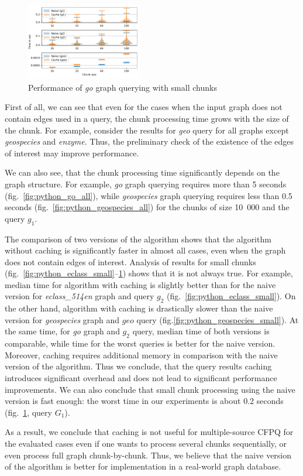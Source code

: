 \begin{figure}[h]
\centering
\includegraphics[width=0.45\textwidth]{data/raw/go_4.pdf}
\caption{Performance of \textit{go} graph querying with small chunks}
\label{fig:python_go_small}
\end{figure}


First of all, we can see that even for the cases when the input graph does not contain edges used in a query, the chunk processing time grows with the size of the chunk.
For example, consider the results for \textit{geo} query for all graphs except \textit{geospecies} and \textit{enzyme}.
Thus, the preliminary check of the existence of the edges of interest may improve performance.

We can also see, that the chunk processing time significantly depends on the graph structure.
For example, \textit{go} graph querying requires more than 5 seconds (fig.~\ref{fig:python_go_all}), while \textit{geospecies} graph querying requires less than 0.5 seconds (fig.~\ref{fig:python_geospecies_all}) for the chunks of size 10~000 and the query $g_1$.

The comparison of two versions of the algorithm shows that the algorithm without caching is significantly faster in almost all cases, even when the graph does not contain edges of interest.
Analysis of results for small chunks (fig.~\ref{fig:python_eclass_small}--\ref{fig:python_go_small}) shows that it is not always true.
For example, median time for algorithm with caching is slightly better than for the naive version for \textit{eclass\_514en} graph and query $g_2$ (fig.~\ref{fig:python_eclass_small}).
On the other hand, algorithm with caching is drastically slower than the naive version for \textit{geospecies} graph and $geo$ query (fig.\ref{fig:python_geospecies_small}).
At the same time, for \textit{go} graph and $g_2$ query, median time of both versions is comparable, while time for the worst queries is better for the naive version.
Moreover, caching requires additional memory in comparison with the naive version of the algorithm.
Thus we conclude, that the query results caching introduces significant overhead and does not lead to significant performance improvements.
We can also conclude that small chunk processing using the naive version is fast enough: the worst time in our experiments is about 0.2 seconds (fig.~\ref{fig:python_go_small}, query $G_1$).


As a result, we conclude that caching is not useful for multiple-source CFPQ for the evaluated cases even if one wants to process several chunks sequentially, or even process full graph chunk-by-chunk.
Thus, we believe that the naive version of the algorithm is better for implementation in a real-world graph database.




